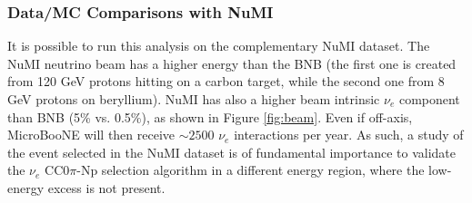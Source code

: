 \subsubsection{Data/MC Comparisons with NuMI}
It is possible to run this analysis on the complementary NuMI dataset. The NuMI neutrino beam has a higher energy than the BNB (the first one is created from 120 GeV protons hitting on a carbon target, while the second one from 8 GeV protons on beryllium). NuMI has also a higher beam intrinsic $\nu_{e}$ component than BNB (5\% vs. 0.5\%), as shown in Figure \ref{fig:beam}. Even if off-axis, MicroBooNE will then receive $\sim2500$ $\nu_{e}$ interactions per year. 
As such, a study of the event selected in the NuMI dataset is of fundamental importance to validate the $\nu_{e}$ CC0$\pi$-Np selection algorithm in a different energy region, where the low-energy excess is not present.

